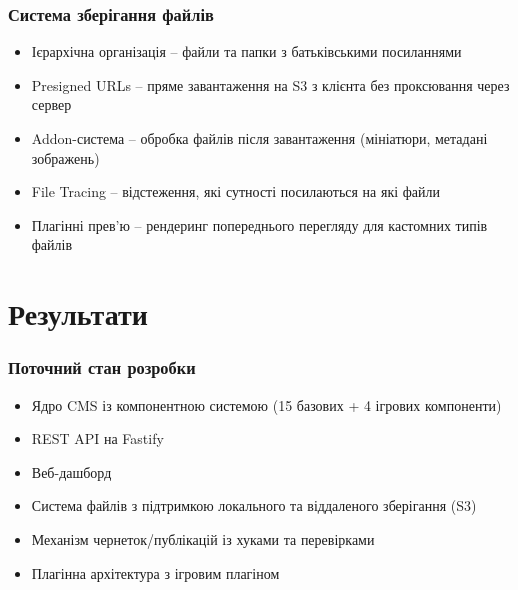 \documentclass[aspectratio=169]{beamer}
\begin{document}
\begin{frame}
\frametitle{Система зберігання файлів}

  \begin{itemize}
    \item Ієрархічна організація -- файли та папки з батьківськими посиланнями
    \item Presigned URLs -- пряме завантаження на S3 з клієнта без проксювання через сервер
    \item Addon-система -- обробка файлів після завантаження (мініатюри, метадані зображень)
    \item File Tracing -- відстеження, які сутності посилаються на які файли
    \item Плагінні прев'ю -- рендеринг попереднього перегляду для кастомних типів файлів
  \end{itemize}
\end{frame}



\section{Результати}

\begin{frame}
\frametitle{Поточний стан розробки}

  \begin{itemize}
    \item Ядро CMS із компонентною системою (15 базових + 4 ігрових компоненти)
    \item REST API на Fastify
    \item Веб-дашборд
    \item Система файлів з підтримкою локального та віддаленого зберігання (S3)
    \item Механізм чернеток/публікацій із хуками та перевірками
    \item Плагінна архітектура з ігровим плагіном
  \end{itemize}
\end{frame}
\end{document}
